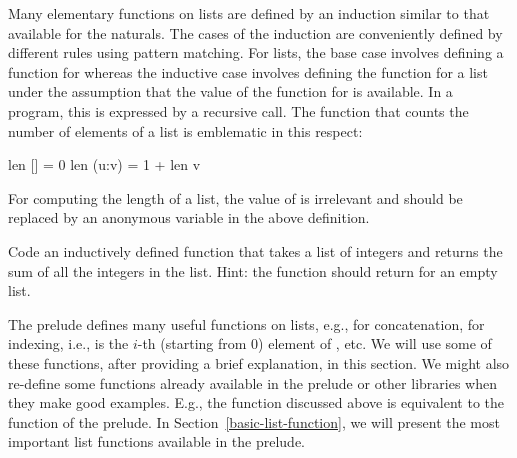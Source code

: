 Many elementary functions on lists are defined by an induction similar
to that available for the naturals.
The cases of the induction are conveniently defined by
different rules using pattern matching.
For lists, the base case involves defining a function for \code{[]}
whereas the inductive case involves defining the function for
a list  under the assumption that the value of the
function for  is available.
In a program, this is expressed by a recursive call.
The function that counts the number of elements of a list
is emblematic in this respect:
%
\begin{prog}
len []    = 0
len (u:v) = 1 + len v
\end{prog}
%
For computing the length of a list, the value of  is irrelevant and
 should be replaced by an anonymous variable in the above
definition.
%
\begin{exercise}
Code an inductively defined function that takes a list of integers and
returns the sum of all the integers in the list.
Hint: the function should return  for an empty list.
\end{exercise}
%
The prelude defines many useful functions on lists,
e.g., \ccode{++} for concatenation, \ccode{!!} for indexing,
i.e.,  is the $i$-th (starting from 0) element of ,
etc.  We will use some of these functions, after providing a brief
explanation, in this section.  We might also re-define some functions
already available in the prelude or other libraries
when they make good examples.  E.g., the function 
discussed above is equivalent to the function 
of the prelude.
In Section~\ref{basic-list-function}, we will present the
most important list functions available in the prelude.

